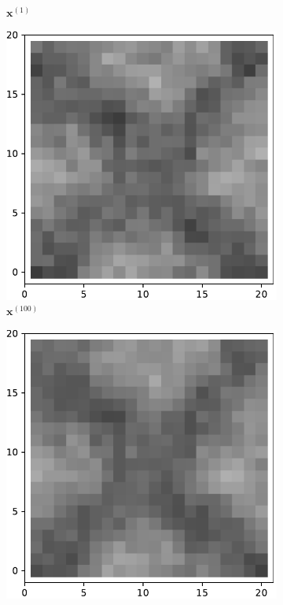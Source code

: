 \begin{figure}[!h]
\begin{subfigure}[b]{0.24\textwidth}
            \caption[]%
            {{\small $\mathbf{x}^{(1)}$}}    
            \label{fig:2d11}
        \end{subfigure}
        \begin{subfigure}[b]{0.24\textwidth}   
            \centering 
            \includegraphics[width=\textwidth]{./img/2d1-99.pdf}
            \caption[]%
            {{\small $\mathbf{x}^{(100)}$}}    
            \label{fig:2d1100}
        \end{subfigure}
        \begin{subfigure}[b]{0.24\textwidth}   
            \centering 
            \includegraphics[width=\textwidth]{./img/2d1mean.pdf}

\end{subfigure}
\end{figure}
